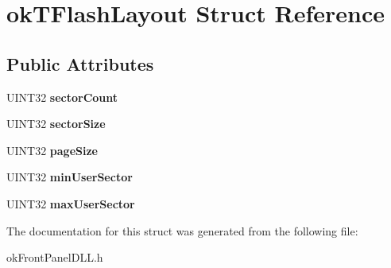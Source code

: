 \hypertarget{structokTFlashLayout}{\section{ok\+T\+Flash\+Layout Struct Reference}
\label{structokTFlashLayout}
}
\subsection*{Public Attributes}
\begin{DoxyCompactItemize}
\item 
\hypertarget{structokTFlashLayout_aef5d0020c89fe47453cf8e4bb2603447}{U\+I\+N\+T32 {\bfseries sector\+Count}}\label{structokTFlashLayout_aef5d0020c89fe47453cf8e4bb2603447}

\item 
\hypertarget{structokTFlashLayout_a214e66757b4eb2ef9b2662313503c316}{U\+I\+N\+T32 {\bfseries sector\+Size}}\label{structokTFlashLayout_a214e66757b4eb2ef9b2662313503c316}

\item 
\hypertarget{structokTFlashLayout_acf61c0caba4ae5c412af414fd419c20b}{U\+I\+N\+T32 {\bfseries page\+Size}}\label{structokTFlashLayout_acf61c0caba4ae5c412af414fd419c20b}

\item 
\hypertarget{structokTFlashLayout_ac1e2bd1d00ff9fd9cd05b70a49069160}{U\+I\+N\+T32 {\bfseries min\+User\+Sector}}\label{structokTFlashLayout_ac1e2bd1d00ff9fd9cd05b70a49069160}

\item 
\hypertarget{structokTFlashLayout_a9ed67119cd3658cbabfc301837a420a3}{U\+I\+N\+T32 {\bfseries max\+User\+Sector}}\label{structokTFlashLayout_a9ed67119cd3658cbabfc301837a420a3}

\end{DoxyCompactItemize}


The documentation for this struct was generated from the following file\+:\begin{DoxyCompactItemize}
\item 
ok\+Front\+Panel\+D\+L\+L.\+h\end{DoxyCompactItemize}
